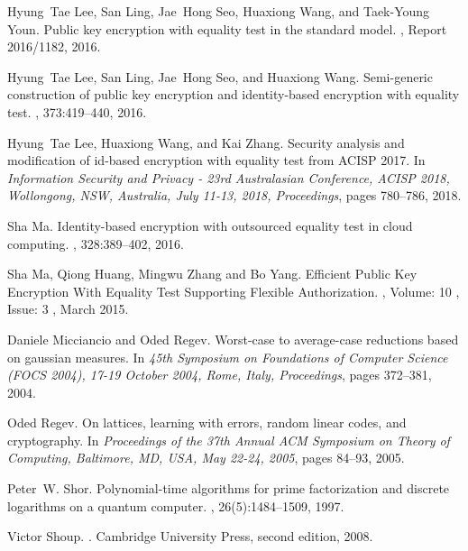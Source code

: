 \documentclass[runningheads,10pt]{llncs}
\begin{document}
\begin{thebibliography}{99}
	Hyung~Tae Lee, San Ling, Jae~Hong Seo, Huaxiong Wang, and Taek-Young Youn.
	\newblock Public key encryption with equality test in the standard model.
	, Report 2016/1182, 2016.
	
	Hyung~Tae Lee, San Ling, Jae~Hong Seo, and Huaxiong Wang.
	\newblock Semi-generic construction of public key encryption and identity-based
	encryption with equality test.
	, 373:419--440, 2016.
	
	Hyung~Tae Lee, Huaxiong Wang, and Kai Zhang.
	\newblock Security analysis and modification of id-based encryption with
	equality test from {ACISP} 2017.
	\newblock In {\em Information Security and Privacy - 23rd Australasian
		Conference, {ACISP} 2018, Wollongong, NSW, Australia, July 11-13, 2018,
		Proceedings}, pages 780--786, 2018.
	
	Sha Ma.
	\newblock Identity-based encryption with outsourced equality test in cloud
	computing.
	, 328:389--402, 2016.
	
	
	Sha Ma,  Qiong Huang, Mingwu Zhang and Bo Yang.
	\newblock Efficient Public Key Encryption With Equality Test
	Supporting Flexible Authorization.
	, Volume: 10 , Issue: 3 , March 2015.
	
	
	Daniele Micciancio and Oded Regev.
	\newblock Worst-case to average-case reductions based on gaussian measures.
	\newblock In {\em 45th Symposium on Foundations of Computer Science {(FOCS}
		2004), 17-19 October 2004, Rome, Italy, Proceedings}, pages 372--381, 2004.
	
	Oded Regev.
	\newblock On lattices, learning with errors, random linear codes, and
	cryptography.
	\newblock In {\em Proceedings of the 37th Annual {ACM} Symposium on Theory of
		Computing, Baltimore, MD, USA, May 22-24, 2005}, pages 84--93, 2005.
	
	Peter~W. Shor.
	\newblock Polynomial-time algorithms for prime factorization and discrete
	logarithms on a quantum computer.
	, 26(5):1484--1509, 1997.
	
	Victor Shoup.
	.
	\newblock Cambridge University Press, second edition, 2008.
	

\end{thebibliography}
\end{document}
